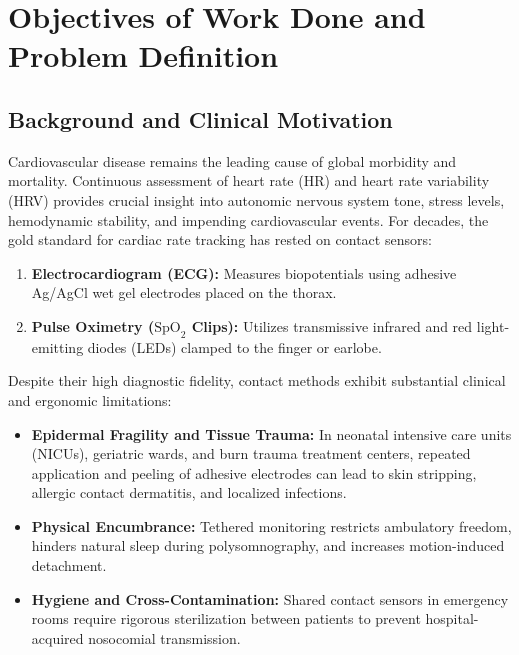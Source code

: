 \documentclass[11pt,a4paper]{report}
\begin{document}
\tableofcontents

\chapter{Objectives of Work Done and Problem Definition}

\section{Background and Clinical Motivation}
Cardiovascular disease remains the leading cause of global morbidity and mortality. Continuous assessment of heart rate (HR) and heart rate variability (HRV) provides crucial insight into autonomic nervous system tone, stress levels, hemodynamic stability, and impending cardiovascular events. For decades, the gold standard for cardiac rate tracking has rested on contact sensors:
\begin{enumerate}
    \item \textbf{Electrocardiogram (ECG):} Measures biopotentials using adhesive Ag/AgCl wet gel electrodes placed on the thorax.
    \item \textbf{Pulse Oximetry (\texorpdfstring{$\text{SpO}_2$}{SpO2} Clips):} Utilizes transmissive infrared and red light-emitting diodes (LEDs) clamped to the finger or earlobe.
\end{enumerate}

Despite their high diagnostic fidelity, contact methods exhibit substantial clinical and ergonomic limitations:
\begin{itemize}
    \item \textbf{Epidermal Fragility and Tissue Trauma:} In neonatal intensive care units (NICUs), geriatric wards, and burn trauma treatment centers, repeated application and peeling of adhesive electrodes can lead to skin stripping, allergic contact dermatitis, and localized infections.
    \item \textbf{Physical Encumbrance:} Tethered monitoring restricts ambulatory freedom, hinders natural sleep during polysomnography, and increases motion-induced detachment.
    \item \textbf{Hygiene and Cross-Contamination:} Shared contact sensors in emergency rooms require rigorous sterilization between patients to prevent hospital-acquired nosocomial transmission.
\end{itemize}
\end{document}
